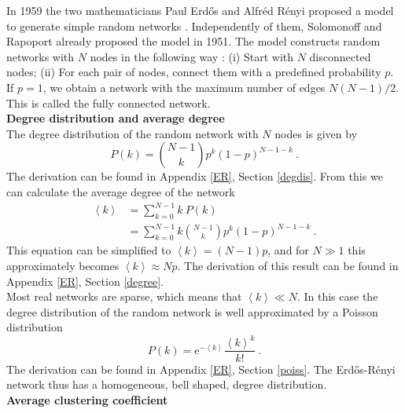 \documentclass[11 pt , letterpaper , twoside , openright]{book}
\begin{document}
In 1959 the two mathematicians Paul Erd\H{o}s and Alfr\'{e}d R\'{e}nyi proposed a model to generate simple random networks \cite{F.Costa2007}. Independently of them, Solomonoff and Rapoport already proposed the model in 1951. The model constructs random networks with $N$ nodes in the following way \cite{Albert2002}: (i) Start with $N$ disconnected nodes; (ii) For each pair of nodes, connect them with a predefined probability $p$.\\
\newline
If $p=1$, we obtain a network with the maximum number of edges $N(N-1)/2$. This is called the fully connected network.\\
\newline
\textbf{Degree distribution and average degree}\\
\newline
The degree distribution of the random network with $N$ nodes is given by
\begin{equation}\label{degDistRan}
	P(k) = \binom{N-1}{k}p^k (1-p)^{N-1-k} \ .
\end{equation}
The derivation can be found in Appendix \ref{ER}, Section \ref{degdis}. From this we can calculate the average degree of the network \cite{Hopcroft2006}
\begin{equation}\label{avDeg}
\begin{split}
	\left<k\right> &= \sum_{k=0}^{N-1} k\  P(k)  \\
&= \sum_{k=0}^{N-1} k \binom{N-1}{k}p^k (1-p)^{N-1-k} \ .
\end{split}
\end{equation}
This equation can be simplified to $\left<k\right> = (N-1)p$, and for $N \gg 1$ this approximately becomes $\left<k\right> \approx Np$. The derivation of this result can be found in Appendix \ref{ER}, Section \ref{degree}.\\
\newpage
\noindent
Most real networks are sparse, which means that $\left<k\right> \ll N$. In this case the degree distribution of the random network is well approximated by a Poisson distribution \cite{Albert2014} 
\begin{equation}
	P(k) = \mathrm{e}^{-\left<k\right>} \frac{\left<k\right>^k}{k!} \ .
\end{equation}
The derivation can be found in Appendix \ref{ER}, Section \ref{poiss}. The Erd\H{o}s-R\'{e}nyi network thus has a homogeneous, bell shaped, degree distribution.\\
\newline
\textbf{Average clustering coefficient}\\
\end{document}
